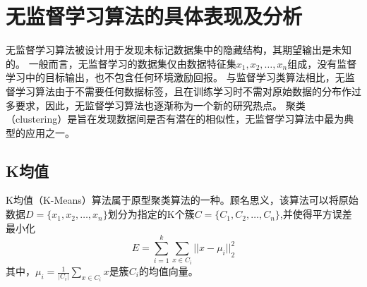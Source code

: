 \section{无监督学习算法的具体表现及分析}
无监督学习算法被设计用于发现未标记数据集中的隐藏结构，其期望输出是未知的。
一般而言，无监督学习的数据集仅由数据特征集$x_1,x_2,\dots,x_n$组成，没有监督学习中的目标输出，也不包含任何环境激励回报\cite{awad2015}。
与监督学习类算法相比，无监督学习算法由于不需要任何数据标签，且在训练学习时不需对原始数据的分布作过多要求，因此，无监督学习算法也逐渐称为一个新的研究热点。
聚类（clustering）是旨在发现数据间是否有潜在的相似性，无监督学习算法中最为典型的应用之一\cite{Liu2018,Li2017}。

\subsection{K均值}
K均值（K-Means）算法属于原型聚类算法的一种\cite{Zhou2016,Liu2018}。顾名思义，该算法可以将原始数据$D=\{x_1,x_2,\dots,x_n\}$划分为指定的K个簇$C=\{C_1,C_2,\dots,C_n\}$,并使得平方误差最小化
\begin{equation}
    \label{equ:leastsq}
    E=\sum_{i=1}^k \sum_{x \in C_i}{||x- \mu_i||}_2^2
\end{equation}
其中，$\mu_i = \frac{1}{|C_i|} \sum_{x \in C_i}{x}$是簇$C_i$的均值向量。

